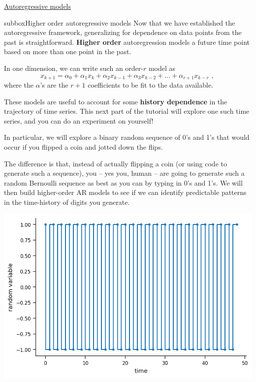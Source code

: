 \begin{textbox}{\href{https://compneuro.neuromatch.io/tutorials/W2D2_LinearSystems/student/W2D2_Tutorial4.html}{Autoregressive models } }
\begin{subbox}{subbox}{Higher order autoregressive models}
\scriptsize
Now that we have established the autoregressive framework, generalizing for dependence on data points from the past is straightforward. \textbf{Higher order} autoregression models a future time point based on more than one point in the past.

In one dimension, we can write such an order-$r$ model as
$$
x_{k+1} = \alpha_0 + \alpha_1 x_k + \alpha_2 x_{k-1} + \alpha_3 x_{k-2} + \dots + \alpha_{r+1} x_{k-r} \text{  , }
$$
where the $\alpha$'s are the $r+1$ coefficients to be fit to the data available.

These models are useful to account for some \textbf{history dependence} in the trajectory of time series. This next part of the tutorial will explore one such time series, and you can do an experiment on yourself!

In particular, we will explore a binary random sequence of 0's and 1's that would occur if you flipped a coin and jotted down the flips. 

The difference is that, instead of actually flipping a coin (or using code to generate such a sequence), you -- yes you, human -- are going to generate such a random Bernoulli sequence as best as you can by typing in 0's and 1's. We will then build higher-order AR models to see if we can identify predictable patterns in the time-history of digits you generate.
\begin{center}
\includegraphics[scale=0.4]{Figures/LS/CDS_Figure11.png}
\end{center}

\end{subbox}
\end{textbox}

